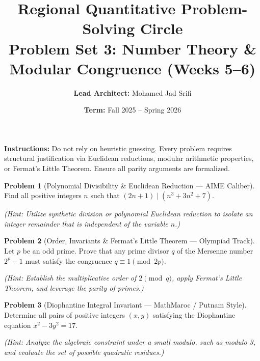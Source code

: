 \documentclass[11pt, a4paper]{article}
\theoremstyle{definition}
\newtheorem{problem}{Problem}
\theoremstyle{plain}
\begin{document}
\title{\vspace{-1.5cm}\textbf{Regional Quantitative Problem-Solving Circle} \\ \Large Problem Set 3: Number Theory \& Modular Congruence (Weeks 5--6)}
\author{\textbf{Lead Architect:} Mohamed Jad Srifi}
\date{\textbf{Term:} Fall 2025 -- Spring 2026}
\maketitle

\noindent\textbf{Instructions:} Do not rely on heuristic guessing. Every problem requires structural justification via Euclidean reductions, modular arithmetic properties, or Fermat's Little Theorem. Ensure all parity arguments are formalized.

\vspace{0.5cm}

\begin{problem}[Polynomial Divisibility \& Euclidean Reduction --- AIME Caliber]
Find all positive integers $n$ such that $(2n + 1) \mid (n^3 + 3n^2 + 7)$. 

\textit{(Hint: Utilize synthetic division or polynomial Euclidean reduction to isolate an integer remainder that is independent of the variable $n$.)}
\end{problem}

\vspace{0.5cm}

\begin{problem}[Order, Invariants \& Fermat's Little Theorem --- Olympiad Track]
Let $p$ be an odd prime. Prove that any prime divisor $q$ of the Mersenne number $2^p - 1$ must satisfy the congruence $q \equiv 1 \pmod{2p}$.

\textit{(Hint: Establish the multiplicative order of $2 \pmod{q}$, apply Fermat's Little Theorem, and leverage the parity of primes.)}
\end{problem}

\vspace{0.5cm}

\begin{problem}[Diophantine Integral Invariant --- MathMaroc / Putnam Style]
Determine all pairs of positive integers $(x, y)$ satisfying the Diophantine equation $x^2 - 3y^2 = 17$.

\textit{(Hint: Analyze the algebraic constraint under a small modulo, such as modulo 3, and evaluate the set of possible quadratic residues.)}
\end{problem}
\end{document}
